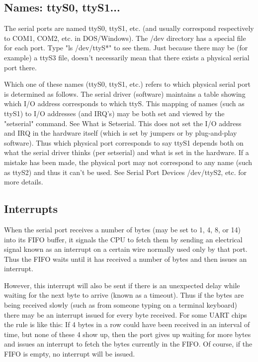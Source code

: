 \documentclass[11pt, twosides, titlepage]{article}
\begin{document}
    \subsection{Names: ttyS0, ttyS1...}

        The serial ports are named ttyS0, ttyS1, etc. (and usually correspond respectively to COM1, COM2, etc. in DOS/Windows). The /dev directory has a special file for each port. Type "ls /dev/ttyS*" to see them. Just because there may be (for example) a ttyS3 file, doesn't necessarily mean that there exists a physical serial port there.

        Which one of these names (ttyS0, ttyS1, etc.) refers to which physical serial port is determined as follows. The serial driver (software) maintains a table showing which I/O address corresponds to which ttyS. This mapping of names (such as ttyS1) to I/O addresses (and IRQ's) may be both set and viewed by the "setserial" command. See What is Setserial. This does not set the I/O address and IRQ in the hardware itself (which is set by jumpers or by plug-and-play software). Thus which physical port corresponds to say ttyS1 depends both on what the serial driver thinks (per setserial) and what is set in the hardware. If a mistake has been made, the physical port may not correspond to any name (such as ttyS2) and thus it can't be used. See Serial Port Devices /dev/ttyS2, etc. for more details.

    \subsection{Interrupts}
    
        When the serial port receives a number of bytes (may be set to 1, 4, 8, or 14) into its FIFO buffer, it signals the CPU to fetch them by sending an electrical signal known as an interrupt on a certain wire normally used only by that port. Thus the FIFO waits until it has received a number of bytes and then issues an interrupt.

        However, this interrupt will also be sent if there is an unexpected delay while waiting for the next byte to arrive (known as a timeout). Thus if the bytes are being received slowly (such as from someone typing on a terminal keyboard) there may be an interrupt issued for every byte received. For some UART chips the rule is like this: If 4 bytes in a row could have been received in an interval of time, but none of these 4 show up, then the port gives up waiting for more bytes and issues an interrupt to fetch the bytes currently in the FIFO. Of course, if the FIFO is empty, no interrupt will be issued.
\end{document}
